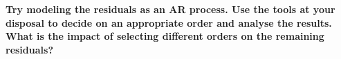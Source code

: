 \item \textbf{Try modeling the residuals as an AR process. Use the tools at your disposal to decide on an appropriate order and analyse the results. What is the impact of selecting different orders on the remaining residuals?}